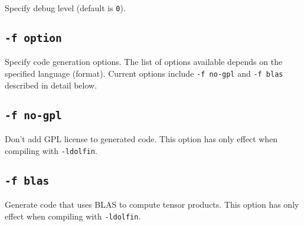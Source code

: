 Specify debug level (default is \texttt{0}).

\subsection{\texttt{-f option}}

Specify code generation options. The list of options available depends
on the specified language (format). Current options include
\texttt{-f no-gpl} and
\texttt{-f blas}
described in detail below.

\subsection{\texttt{-f no-gpl}}

Don't add GPL license to generated code. This option has only effect
when compiling with \texttt{-ldolfin}.

\subsection{\texttt{-f blas}}

Generate code that uses BLAS to compute tensor products. This option
has only effect when compiling with \texttt{-ldolfin}.